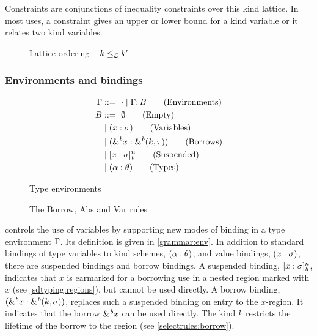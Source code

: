 Constraints are conjunctions of inequality constraints over this kind
lattice. In most uses, a constraint gives an upper or lower bound for
a kind variable or it relates two kind variables.

\begin{figure}[tp]
  
  \caption{Lattice ordering -- $k \leq_\mathcal L k'$}
  \label{sdtyp:lattice}
\end{figure}


\subsubsection{Environments and bindings}
\label{sdtyping:envs}
\begin{figure*}[tp]
  \begin{minipage}{0.28\linewidth}
    \begin{align*}
      \Gamma &::=\ \cdot \mid \Gamma;B\tag{Environments}\\
      B &::=\ \emptyset \tag{Empty} \\
         &\mid (x : \sigma)\tag{Variables}\\
         &\mid ({\&}^{\textit{b}}x : {\&}^{\textit{b}}(k,\tau))\tag{Borrows}\\
         &\mid [x : \sigma]_{\textit{b}}^n \tag{Suspended}\\
         &\mid (\alpha : \theta)\tag{Types}
    \end{align*}
    \caption{Type environments}
    \label{grammar:env}
  \end{minipage}\hfill
  \begin{minipage}{0.7\linewidth}
    \caption{The {\sc Borrow}, {\sc Abs} and {\sc Var} rules}
    \label{selectrules:borrow}
    \label{selectrules:binders}
  \end{minipage}
\end{figure*}

\lang controls the use of variables by supporting new modes of
binding in a type environment $\Gamma$.
Its definition is given in  \cref{grammar:env}.
In addition to standard bindings of type variables to kind schemes,
$(\alpha : \theta)$,  and value bindings, $(x : \sigma)$, there
are suspended bindings and borrow bindings.
A suspended binding, $[x : \sigma]_{\textit{b}}^n$, indicates that $x$ is
earmarked for a borrowing use in a nested region
marked with $x$ (see \cref{sdtyping:regions}), but
cannot be used directly.
A borrow binding, $({\&}^{\textit{b}}x : {\&}^{\textit{b}}(k,\sigma))$, replaces
such a suspended binding on entry to the $x$-region. It indicates
that the borrow ${\&}^{\textit{b}}x$ can be used directly. The kind $k$
restricts the lifetime of the borrow to the region (see \cref{selectrules:borrow}).

